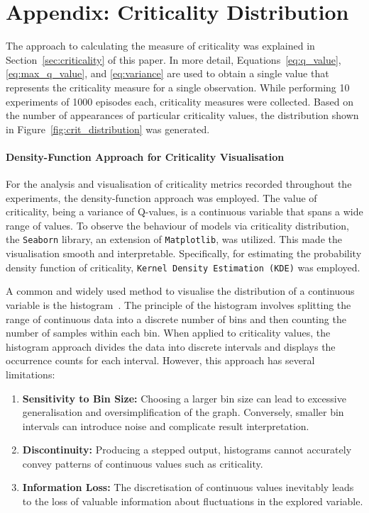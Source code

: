 \appendix
\section{Appendix: Criticality Distribution}\label{sec:subsec_6.1}

The approach to calculating the measure of criticality was explained in Section~\ref{sec:criticality} of this paper. In more detail, Equations~\eqref{eq:q_value}, \eqref{eq:max_q_value}, and \eqref{eq:variance} are used to obtain a single value that represents the criticality measure for a single observation. While performing 10 experiments of 1000 episodes each, criticality measures were collected. Based on the number of appearances of particular criticality values, the distribution shown in Figure~\ref{fig:crit_distribution} was generated.

\paragraph{Density-Function Approach for Criticality Visualisation}

For the analysis and visualisation of criticality metrics recorded throughout the experiments, the density-function approach was employed. The value of criticality, being a variance of Q-values, is a continuous variable that spans a wide range of values. To observe the behaviour of models via criticality distribution, the \texttt{Seaborn} library, an extension of \texttt{Matplotlib}, was utilized. This made the visualisation smooth and interpretable. Specifically, for estimating the probability density function of criticality, \texttt{Kernel Density Estimation (KDE)} was employed.

A common and widely used method to visualise the distribution of a continuous variable is the histogram~\cite{kde2018}. The principle of the histogram involves splitting the range of continuous data into a discrete number of bins and then counting the number of samples within each bin. When applied to criticality values, the histogram approach divides the data into discrete intervals and displays the occurrence counts for each interval. However, this approach has several limitations:

\begin{enumerate}
    \item \textbf{Sensitivity to Bin Size:} Choosing a larger bin size can lead to excessive generalisation and oversimplification of the graph. Conversely, smaller bin intervals can introduce noise and complicate result interpretation.
    \item \textbf{Discontinuity:} Producing a stepped output, histograms cannot accurately convey patterns of continuous values such as criticality.
    \item \textbf{Information Loss:} The discretisation of continuous values inevitably leads to the loss of valuable information about fluctuations in the explored variable.
\end{enumerate}

